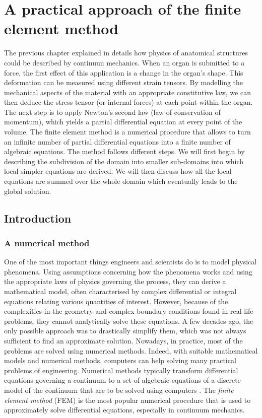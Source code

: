 \chapter{A practical approach of the finite element method}
\label{chap3}
\begin{shortAbstract}
The previous chapter explained in details how physics of anatomical structures could be described by continuun mechanics. When an organ is submitted to a force, the first effect of this application is a change in the organ's shape. This deformation can be measured using different strain tensors. By modelling the mechanical aspects of the material with an appropriate constitutive law, we can then deduce the stress tensor (or internal forces) at each point within the organ. The next step is to apply Newton's second law (law of conservation of momentum), which yields a partial differential equation at every point of the volume. The finite element method is a numerical procedure that allows to turn an infinite number of partial differential equations into a finite number of algebraic equations. The method follows different steps. We will first begin by describing the subdivision of the domain into smaller sub-domains into which local simpler equations are derived. We will then discuss how all the local equations are summed over the whole domain which eventually leads to the global solution. 
\end{shortAbstract}


\section{Introduction}

	\subsection{A numerical method}
One of the most important things engineers and scientists do is to model physical phenomena. Using assumptions concerning how the phenomena works and using the appropriate laws of physics governing the process, they can derive a mathematical model, often characterised by complex differential or integral equations relating various quantities of interest. However, because of the complexities in the geometry and complex boundary conditions found in real life problems, they cannot analytically solve these equations. A few decades ago, the only possible approach was to drastically simplify them, which was not always sufficient to find an approximate solution. Nowadays, in practice, most of the problems are solved using numerical methods. Indeed, with suitable mathematical models and numerical methods, computers can help solving many practical problems of engineering. Numerical methods typically transform differential equations governing a continuum to a set of algebraic equations of a discrete model of the continuum that are to be solved using computers \citep{Reddy93}. The \emph{finite element method} (FEM) is the most popular numerical procedure that is used to approximately solve differential equations, especially in continuum mechanics. 
	
